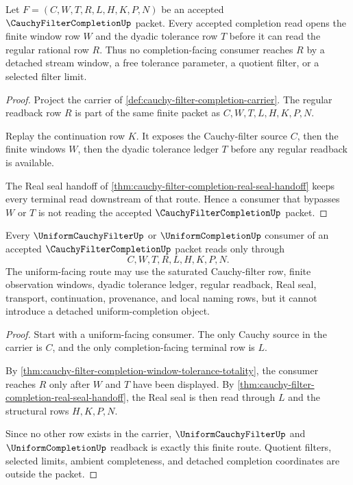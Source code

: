 \begin{theorem}
\label{thm:cauchy-filter-completion-window-tolerance-totality}
Let $F=(C,W,T,R,L,H,K,P,N)$ be an accepted $\CauchyFilterCompletionUp$ packet. Every accepted completion read opens the finite window row $W$ and the dyadic tolerance row $T$ before it can read the regular rational row $R$. Thus no completion-facing consumer reaches $R$ by a detached stream window, a free tolerance parameter, a quotient filter, or a selected filter limit.
\end{theorem}
\begin{proof}
Project the carrier of \autoref{def:cauchy-filter-completion-carrier}. The regular readback row $R$ is part of the same finite packet as $C,W,T,L,H,K,P,N$.

Replay the continuation row $K$. It exposes the Cauchy-filter source $C$, then the finite windows $W$, then the dyadic tolerance ledger $T$ before any regular readback is available.

The Real seal handoff of \autoref{thm:cauchy-filter-completion-real-seal-handoff} keeps every terminal read downstream of that route. Hence a consumer that bypasses $W$ or $T$ is not reading the accepted $\CauchyFilterCompletionUp$ packet.
\end{proof}

\begin{theorem}
\label{thm:cauchy-filter-completion-uniform-filter-readback}
Every $\UniformCauchyFilterUp$ or $\UniformCompletionUp$ consumer of an accepted $\CauchyFilterCompletionUp$ packet reads only through
$$
C,W,T,R,L,H,K,P,N .
$$
The uniform-facing route may use the saturated Cauchy-filter row, finite observation windows, dyadic tolerance ledger, regular readback, Real seal, transport, continuation, provenance, and local naming rows, but it cannot introduce a detached uniform-completion object.
\end{theorem}
\begin{proof}
Start with a uniform-facing consumer. The only Cauchy source in the carrier is $C$, and the only completion-facing terminal row is $L$.

By \autoref{thm:cauchy-filter-completion-window-tolerance-totality}, the consumer reaches $R$ only after $W$ and $T$ have been displayed. By \autoref{thm:cauchy-filter-completion-real-seal-handoff}, the Real seal is then read through $L$ and the structural rows $H,K,P,N$.

Since no other row exists in the carrier, $\UniformCauchyFilterUp$ and $\UniformCompletionUp$ readback is exactly this finite route. Quotient filters, selected limits, ambient completeness, and detached completion coordinates are outside the packet.
\end{proof}

